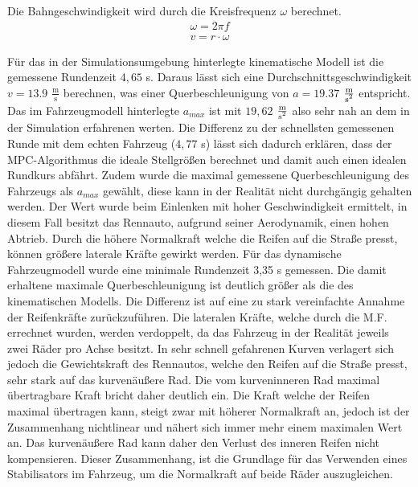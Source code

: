 \documentclass{like}
\begin{document}
Die Bahngeschwindigkeit wird durch die Kreisfrequenz $\omega$ berechnet.
\begin{eqnarray}
	 \omega = 2 \pi f \\
	 v = r \cdot \omega
\end{eqnarray}


Für das in der Simulationsumgebung hinterlegte kinematische Modell ist die gemessene Rundenzeit $4,65$ s. Daraus lässt sich eine Durchschnittsgeschwindigkeit $ v= 13.9$ $ \frac{\text{m}}{\text{s}}$ berechnen, was einer Querbeschleunigung von $a = 19.37$ $ \frac{\text{m}}{\text{s\textsuperscript{2}}}$ entspricht. Das im Fahrzeugmodell hinterlegte $a_{max}$ ist mit $19,62$ $ \frac{\text{m}}{\text{s\textsuperscript{2}}}$ also sehr nah an dem in der Simulation erfahrenen werten. Die Differenz zu der schnellsten gemessenen Runde mit dem echten Fahrzeug ($4,77$ s) lässt sich dadurch erklären, dass der MPC-Algorithmus die ideale Stellgrößen berechnet und damit auch einen idealen Rundkurs abfährt. Zudem wurde die maximal gemessene Querbeschleunigung des Fahrzeugs als $a_{max}$ gewählt, diese kann in der Realität nicht durchgängig gehalten werden. Der Wert wurde beim Einlenken mit hoher Geschwindigkeit ermittelt, in diesem Fall besitzt das Rennauto, aufgrund seiner Aerodynamik, einen hohen Abtrieb. Durch die höhere Normalkraft welche die Reifen auf die Straße presst, können größere laterale Kräfte gewirkt werden.
Für das dynamische Fahrzeugmodell wurde eine minimale Rundenzeit 3,35 s gemessen.  Die damit erhaltene maximale Querbeschleunigung ist deutlich größer als die des kinematischen Modells. Die Differenz ist auf eine zu stark vereinfachte Annahme der Reifenkräfte zurückzuführen. Die lateralen Kräfte, welche durch die \ac{M.F.} errechnet wurden, werden verdoppelt, da das Fahrzeug in der Realität jeweils zwei Räder pro Achse besitzt. In sehr schnell gefahrenen Kurven verlagert sich jedoch die Gewichtskraft des Rennautos, welche den Reifen auf die Straße presst, sehr stark auf das kurvenäußere Rad. Die vom kurveninneren Rad maximal übertragbare Kraft bricht daher deutlich ein. Die Kraft welche der Reifen maximal übertragen kann, steigt zwar mit höherer Normalkraft an, jedoch ist der Zusammenhang nichtlinear und nähert sich immer mehr einem maximalen Wert an. Das kurvenäußere Rad kann daher den Verlust des inneren Reifen nicht kompensieren. Dieser Zusammenhang, ist die Grundlage für das Verwenden eines Stabilisators im Fahrzeug, um die Normalkraft auf beide Räder auszugleichen.
\end{document}

